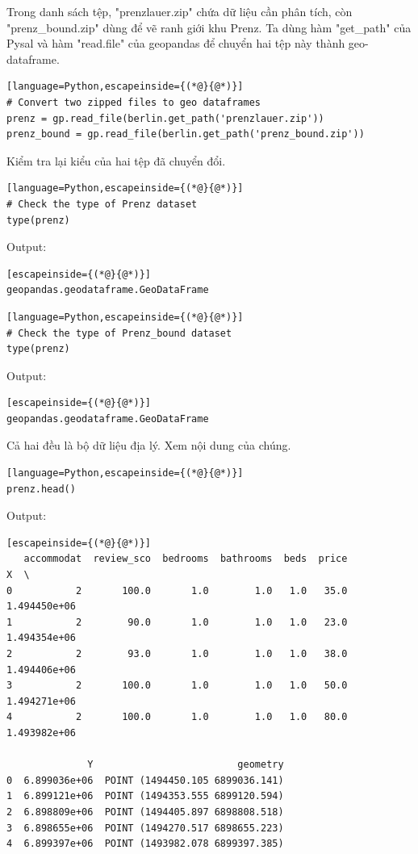 Trong danh sách tệp, "prenzlauer.zip" chứa dữ liệu cần phân tích, còn "prenz\_bound.zip" dùng để vẽ ranh giới khu Prenz. Ta dùng hàm "get\_path" của Pysal và hàm "read.file" của geopandas để chuyển hai tệp này thành geo-dataframe.

\begin{lstlisting}[language=Python,escapeinside={(*@}{@*)}]
# Convert two zipped files to geo dataframes
prenz = gp.read_file(berlin.get_path('prenzlauer.zip'))
prenz_bound = gp.read_file(berlin.get_path('prenz_bound.zip'))
\end{lstlisting}

Kiểm tra lại kiểu của hai tệp đã chuyển đổi.

\begin{lstlisting}[language=Python,escapeinside={(*@}{@*)}]
# Check the type of Prenz dataset
type(prenz)
\end{lstlisting}

Output:

\begin{lstlisting}[escapeinside={(*@}{@*)}]
geopandas.geodataframe.GeoDataFrame
\end{lstlisting}

\begin{lstlisting}[language=Python,escapeinside={(*@}{@*)}]
# Check the type of Prenz_bound dataset
type(prenz)
\end{lstlisting}

Output:

\begin{lstlisting}[escapeinside={(*@}{@*)}]
geopandas.geodataframe.GeoDataFrame
\end{lstlisting}

Cả hai đều là bộ dữ liệu địa lý. Xem nội dung của chúng.

\begin{lstlisting}[language=Python,escapeinside={(*@}{@*)}]
prenz.head()
\end{lstlisting}

Output:

\begin{lstlisting}[escapeinside={(*@}{@*)}]
   accommodat  review_sco  bedrooms  bathrooms  beds  price             X  \
0           2       100.0       1.0        1.0   1.0   35.0  1.494450e+06   
1           2        90.0       1.0        1.0   1.0   23.0  1.494354e+06   
2           2        93.0       1.0        1.0   1.0   38.0  1.494406e+06   
3           2       100.0       1.0        1.0   1.0   50.0  1.494271e+06   
4           2       100.0       1.0        1.0   1.0   80.0  1.493982e+06   

              Y                         geometry  
0  6.899036e+06  POINT (1494450.105 6899036.141)  
1  6.899121e+06  POINT (1494353.555 6899120.594)  
2  6.898809e+06  POINT (1494405.897 6898808.518)  
3  6.898655e+06  POINT (1494270.517 6898655.223)  
4  6.899397e+06  POINT (1493982.078 6899397.385)
\end{lstlisting}

